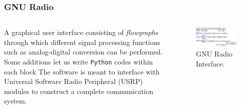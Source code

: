 \documentclass[10pt]{beamer}
\begin{document}
\begin{frame}
    \frametitle{GNU Radio}
    \begin{columns}[] %
        \begin{column}{.5\textwidth}
        \begin{outline}
            \small
    \1 A graphical user interface consisting of \textit{flowgraphs} through which different signal processing functions such as analog-digital conversion can be performed.
    \1 Some additions let us write \texttt{Python} codes within each block
    \1 The software is meant to interface with Universal Software Radio Peripheral (USRP) modules to construct a complete communication system.
\end{outline}   
\end{column}
\begin{column}{.5\textwidth}
\begin{figure}[h!]
    \centering
    \includegraphics[width=.95\textwidth]{FSK_example_fg.png}
    \caption{GNU Radio Interface.}
\end{figure}
\end{column}%
\end{columns}   

\end{frame}
\end{document}
